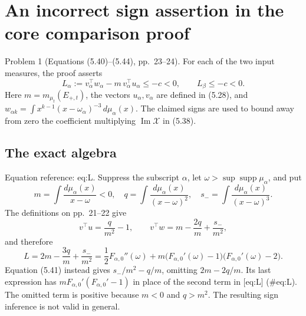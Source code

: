 \documentclass[10pt]{article}
\begin{document}
\section*{An incorrect sign assertion in the core comparison proof}
Problem 1 (Equations (5.40)–(5.44), pp. 23–24).  For each of the two input measures, the proof asserts \[L_\alpha:=v_\alpha^{\top}w_\alpha
              -m\,v_\alpha^{\top}u_\alpha\le-c<0,
 \qquad
 L_\beta\le-c<0.\] Here \(m=m_{\mu_t}(E_{+,t})\), the vectors \(u_\alpha,v_\alpha\) are defined in (5.28), and \(w_{\alpha k}=\int x^{k-1}(x-\omega_\alpha)^{-3}\,d\mu_\alpha(x)\). The claimed signs are used to bound away from zero the coefficient multiplying \(\operatorname{Im}\mathcal X\) in (5.38).\par
\subsection*{The exact algebra}
Equation reference: eq:L. Suppress the subscript \(\alpha\), let \(\omega>\sup\operatorname{supp}\mu_\alpha\), and put \[m=\int\frac{d\mu_\alpha(x)}{x-\omega}<0,\quad
 q=\int\frac{d\mu_\alpha(x)}{(x-\omega)^2},\quad
 s_-=\int\frac{d\mu_\alpha(x)}{(x-\omega)^3}.\] The definitions on pp. 21–22 give \[v^{\top}u=\frac{q}{m^2}-1,\qquad
 v^{\top}w=m-\frac{2q}{m}+\frac{s_-}{m^2},\] and therefore \[
 L=2m-\frac{3q}{m}+\frac{s_-}{m^2}
   =\frac12F_{\alpha,0}''(\omega)
      +m\bigl(F_{\alpha,0}'(\omega)-1\bigr)
          \bigl(F_{\alpha,0}'(\omega)-2\bigr).\] Equation (5.41) instead gives \(s_-/m^2-q/m\), omitting \(2m-2q/m\). Its last expression has \(mF_{\alpha,0}'(F_{\alpha,0}'-1)\) in place of the second term in [eq:L] (\#eq:L). The omitted term is positive because \(m<0\) and \(q>m^2\). The resulting sign inference is not valid in general.\par
\end{document}
